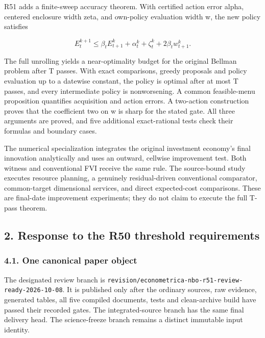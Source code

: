 \documentclass[ecta,nameyear,draft]{econsocart}
\begin{document}
R51 adds a finite-sweep accuracy theorem. With certified action error
alpha, centered enclosure width zeta, and own-policy evaluation width w,
the new policy satisfies

\[
 E_t^{k+1}\leq\beta_t E_{t+1}^k+
 \alpha_t^k+\zeta_t^k+2\beta_tw_{t+1}^k.
\]

The full unrolling yields a near-optimality budget for the original
Bellman problem after T passes. With exact comparisons, greedy proposals
and policy evaluation up to a datewise constant, the policy is optimal
after at most T passes, and every intermediate policy is nonworsening. A
common feasible-menu proposition quantifies acquisition and action
errors. A two-action construction proves that the coefficient two on w
is sharp for the stated gate. All three arguments are proved, and five
additional exact-rational tests check their formulas and boundary cases.

The numerical specialization integrates the original investment
economy's final innovation analytically and uses an outward, cellwise
improvement test. Both witness and conventional FVI receive the same
rule. The source-bound study executes resource planning, a genuinely
residual-driven conventional comparator, common-target dimensional
services, and direct expected-cost comparisons. These are final-date
improvement experiments; they do not claim to execute the full T-pass
theorem.

\hypertarget{response-to-the-r50-threshold-requirements}{%
\subsection{2. Response to the R50 threshold
requirements}\label{response-to-the-r50-threshold-requirements}}

\hypertarget{one-canonical-paper-object}{%
\subsubsection{4.1. One canonical paper
object}\label{one-canonical-paper-object}}

The designated review branch is
\nolinkurl{revision/econometrica-nbo-r51-review-ready-2026-10-08}. It is
published only after the ordinary sources, raw evidence, generated
tables, all five compiled documents, tests and clean-archive build have
passed their recorded gates. The integrated-source branch has the same
final delivery head. The science-freeze branch remains a distinct
immutable input identity.
\end{document}
